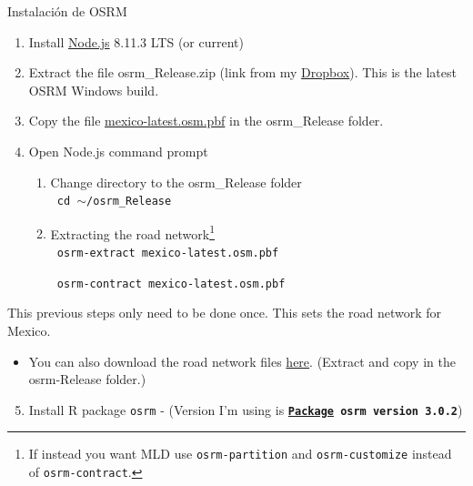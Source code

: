 \documentclass[8pt]{beamer}
\begin{document}
\appendix
\begin{frame}[label=dist]{Instalación de OSRM}

\begin{enumerate}[(1)]
    \item Install \color{blue}\href{https://nodejs.org/en/}{Node.js} \color{black} 8.11.3 LTS (or current)
    \item Extract the file osrm\_Release.zip (link from my \color{blue}\href{https://www.dropbox.com/s/eeo5f9ws7hmair4/osrm_Release.zip?dl=0}{Dropbox}).\color{black} This is the latest OSRM Windows build.
    \item \color{black} Copy the file  \color{blue}\href{https://download.geofabrik.de/north-america/mexico-latest.osm.pbf}{mexico-latest.osm.pbf} \color{black}in the osrm\_Release folder.
    \item Open Node.js command prompt
   \begin{enumerate}
        \item Change directory to the osrm\_Release folder\\
        
                \texttt{         cd $\sim$/osrm\_Release}  
                
        \item Extracting the road network\footnote{If instead you want MLD use \texttt{osrm-partition} and \texttt{osrm-customize} instead of \texttt{osrm-contract}.}\\
        
                \texttt{         osrm-extract mexico-latest.osm.pbf}
                
                \texttt{         osrm-contract mexico-latest.osm.pbf}
            
    \end{enumerate}
\end{enumerate}

This previous steps only need to be done once. This sets the road network for Mexico.
    \begin{itemize}
        \item You can also download the road network files \color{blue}\href{https://www.dropbox.com/s/2yflj2kfb24ujms/mexico-latest.zip?dl=0}{here}. \color{black} (Extract and copy in the osrm-Release folder.) 
    \end{itemize}
    
    \begin{enumerate}[(1)]
\setcounter{enumi}{4}
\item Install R package \texttt{osrm} - (Version I'm using is \textbf{\texttt{\href{https://cran.r-project.org/src/contrib/Archive/osrm/}{Package} osrm version 3.0.2}})
    \end{enumerate}
    
\end{frame}
\end{document}
